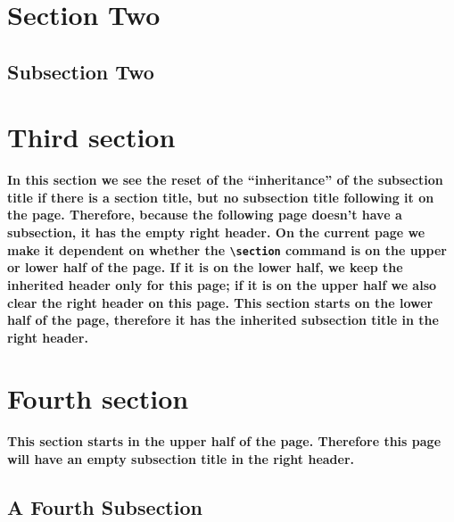 \documentclass{article}
\begin{document}
 \lipsum[1-2]

\section{Section Two}

 \lipsum[3]

\subsection{Subsection Two}

 \lipsum[4-7]

\section{Third section}
\label{sec:flaw}

{\bfseries In this section we see the reset of the ``inheritance'' of the subsection title if there is a section title, but no subsection title following it on the page. Therefore, because the following page doesn't have a subsection, it has the empty right header. On the current page we make it dependent on whether the \verb|\section| command is on the upper or lower half of the page. If it is on the lower half, we keep the inherited header only for this page; if it is on the upper half we also clear the right header on this page. This section starts on the lower half of the page, therefore it has the inherited subsection title in the right header.}

\medskip

\lipsum

\section{Fourth section}
\label{sec:missing}

{\bfseries This section starts in the upper half of the page. Therefore this page will have an empty subsection title in the right header.}

\medskip

\lipsum[1-4]

\subsection{A Fourth Subsection}

\lipsum[7-9]
\end{document}
